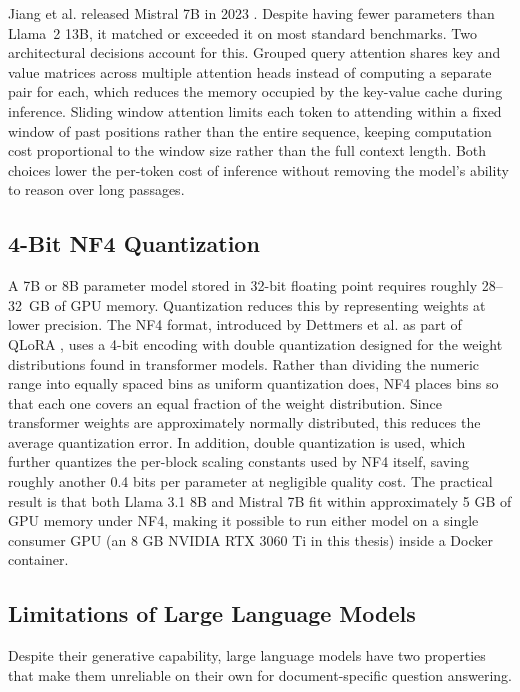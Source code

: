 Jiang et al. released Mistral 7B in 2023 \cite{jiang2023mistral}. Despite having fewer parameters than Llama~2 13B, it matched or exceeded it on most standard benchmarks. Two architectural decisions account for this. Grouped query attention shares key and value matrices across multiple attention heads instead of computing a separate pair for each, which reduces the memory occupied by the key-value cache during inference. Sliding window attention limits each token to attending within a fixed window of past positions rather than the entire sequence, keeping computation cost proportional to the window size rather than the full context length. Both choices lower the per-token cost of inference without removing the model's ability to reason over long passages.

\subsection{4-Bit NF4 Quantization}

A 7B or 8B parameter model stored in 32-bit floating point requires roughly 28--32~GB of GPU memory. Quantization reduces this by representing weights at lower precision. The NF4 format, introduced by Dettmers et al. as part of QLoRA \cite{dettmers2023qlora}, uses a 4-bit encoding with double quantization designed for the weight distributions found in transformer models. Rather than dividing the numeric range into equally spaced bins as uniform quantization does, NF4 places bins so that each one covers an equal fraction of the weight distribution. Since transformer weights are approximately normally distributed, this reduces the average quantization error. In addition, double quantization is used, which further quantizes the per-block scaling constants used by NF4 itself, saving roughly another 0.4 bits per parameter at negligible quality cost.  The practical result is that both Llama 3.1 8B and Mistral 7B fit within approximately 5 GB of GPU memory under NF4, making it possible to run either model on a single consumer GPU (an 8 GB NVIDIA RTX 3060 Ti in this thesis) inside a Docker container.

\subsection{Limitations of Large Language Models}

Despite their generative capability, large language models have two properties that make them unreliable on their own for document-specific question answering.

